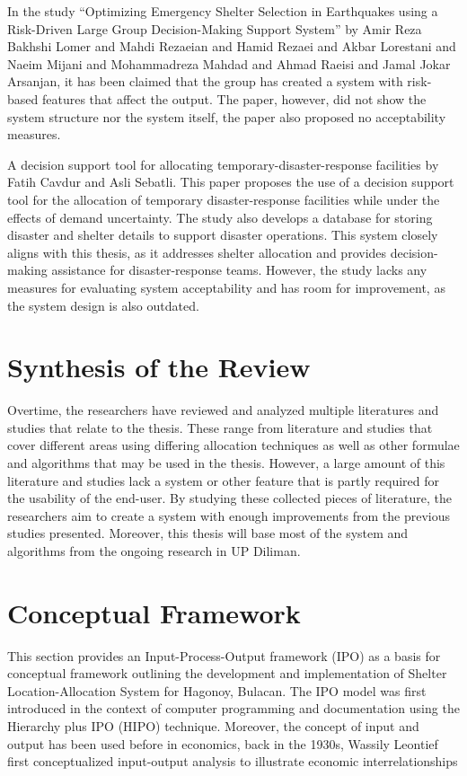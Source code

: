 	In the study “Optimizing Emergency Shelter Selection in Earthquakes using a Risk-Driven Large Group Decision-Making Support System” by Amir Reza Bakhshi Lomer and Mahdi Rezaeian and Hamid Rezaei and Akbar Lorestani and Naeim Mijani and Mohammadreza Mahdad and Ahmad Raeisi and Jamal Jokar Arsanjan, it has been claimed that the group has created a system with risk-based features that affect the output. The paper, however, did not show the system structure nor the system itself, the paper also proposed no acceptability measures. \parencite{Amir2023}
	
	A decision support tool for allocating temporary-disaster-response facilities by Fatih Cavdur and Asli Sebatli. This paper proposes the use of a decision support tool for the allocation of temporary disaster-response facilities while under the effects of demand uncertainty. The study also develops a database for storing disaster and shelter details to support disaster operations. This system closely aligns with this thesis, as it addresses shelter allocation and provides decision-making assistance for disaster-response teams. However, the study lacks any measures for evaluating system acceptability and has room for improvement, as the system design is also outdated. \parencite{Cavdur2019}

\section{Synthesis of the Review}
	Overtime, the researchers have reviewed and analyzed multiple literatures and studies that relate to the thesis. These range from literature and studies that cover different areas using differing allocation techniques as well as other formulae and algorithms that may be used in the thesis. However, a large amount of this literature and studies lack a system or other feature that is partly required for the usability of the end-user. By studying these collected pieces of literature, the researchers aim to create a system with enough improvements from the previous studies presented. Moreover, this thesis will base most of the system and algorithms from the ongoing research in UP Diliman. 

\section{Conceptual Framework}
	This section provides an Input-Process-Output framework (IPO) as a basis for conceptual framework outlining the development and implementation of Shelter Location-Allocation System for Hagonoy, Bulacan. The IPO model was first introduced in the context of computer programming and documentation using the Hierarchy plus IPO (HIPO) technique. Moreover, the concept of input and output has been used before in economics, back in the 1930s, Wassily Leontief first conceptualized input-output analysis to illustrate economic interrelationships
	
